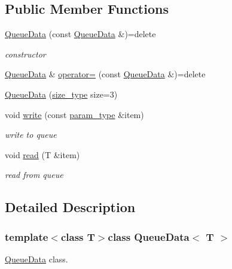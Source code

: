 \subsection*{Public Member Functions}
\begin{DoxyCompactItemize}
\item 
\hyperlink{class_queue_data_a0c3c2aa0a2c42eee45cf8fbcce511785}{Queue\+Data} (const \hyperlink{class_queue_data}{Queue\+Data} \&)=delete
\begin{DoxyCompactList}\small\item\em constructor \end{DoxyCompactList}\item 
\hyperlink{class_queue_data}{Queue\+Data} \& \hyperlink{class_queue_data_a0991aeae44d7ec57b3f0fbdb7867976b}{operator=} (const \hyperlink{class_queue_data}{Queue\+Data} \&)=delete
\item 
\hyperlink{class_queue_data_a053bfdfafd3b44b23e86910623c7dbdc}{Queue\+Data} (\hyperlink{class_queue_data_a91e3b70427c70371043664724c62f6ce}{size\+\_\+type} size=3)
\item 
void \hyperlink{class_queue_data_aea2116b559b77ae69cb2399cb3ee0d6c}{write} (const \hyperlink{class_queue_data_a15ff80c62590d5e134ef147ccab7b0e6}{param\+\_\+type} \&item)
\begin{DoxyCompactList}\small\item\em write to queue \end{DoxyCompactList}\item 
void \hyperlink{class_queue_data_a23ce1f992a6c01b1ac2329fba86f0a90}{read} (T \&item)
\begin{DoxyCompactList}\small\item\em read from queue \end{DoxyCompactList}\end{DoxyCompactItemize}


\subsection{Detailed Description}
\subsubsection*{template$<$class T$>$class Queue\+Data$<$ T $>$}

\hyperlink{class_queue_data}{Queue\+Data} class. 

